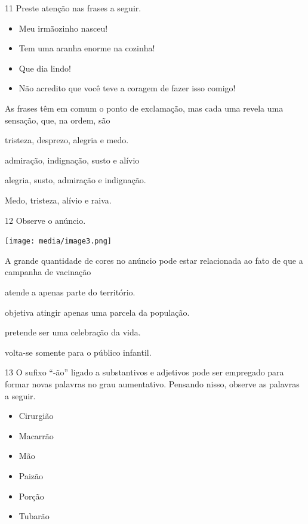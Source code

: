 \num{11} Preste atenção nas frases a seguir.

\begin{itemize}
\item Meu irmãozinho nasceu!

\item Tem uma aranha enorme na cozinha!

\item Que dia lindo!

\item Não acredito que você teve a coragem de fazer isso comigo!
\end{itemize}

As frases têm em comum o ponto de exclamação, mas cada uma revela uma
sensação, que, na ordem, são

\begin{escolha}
\item tristeza, desprezo, alegria e medo.

\item admiração, indignação, susto e alívio

\item alegria, susto, admiração e indignação.

\item Medo, tristeza, alívio e raiva.
\end{escolha}


\num{12} Observe o anúncio.

\texttt{[image: media/image3.png]}


A grande quantidade de cores no anúncio pode estar relacionada ao fato
de que a campanha de vacinação

\begin{escolha}
\item atende a apenas parte do território.

\item objetiva atingir apenas uma parcela da população.

\item pretende ser uma celebração da vida.

\item volta-se somente para o público infantil.
\end{escolha}



\num{13} O sufixo ``-ão'' ligado a substantivos e adjetivos pode ser
empregado para formar novas palavras no grau aumentativo. Pensando
nisso, observe as palavras a seguir.

\begin{itemize}
\item Cirurgião

\item Macarrão

\item Mão

\item Paizão

\item Porção

\item Tubarão
\end{itemize}

